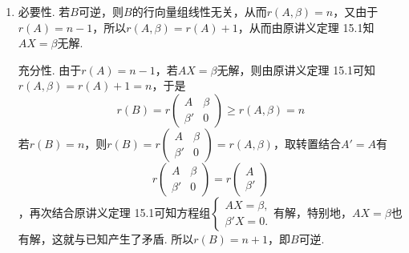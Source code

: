 \documentclass[12pt,fontset=fandol]{ctexart}
\begin{document}
\begin{solve}
\begin{enumerate}
                \item 必要性. 若$B$可逆，则$B$的行向量组线性无关，从而$r(A,\beta)=n$，又由于$r(A)=n-1$，所以$r(A,\beta)=r(A)+1$，从而由原讲义定理 15.1知$AX=\beta$无解.

                      充分性. 由于$r(A)=n-1$，若$AX=\beta$无解，则由原讲义定理 15.1可知$r(A,\beta)=r(A)+1=n$，于是
                      \[ r(B)=r\begin{pmatrix}
                              A      & \beta \\
                              \beta' & 0
                          \end{pmatrix}\geqslant r(A,\beta)=n \]
                      若$r(B)=n$，则$r(B)=r\begin{pmatrix}
                              A      & \beta \\
                              \beta' & 0
                          \end{pmatrix}=r(A,\beta)$，取转置结合$A'=A$有
\[r\begin{pmatrix}
                              A      & \beta \\
                              \beta' & 0
                          \end{pmatrix}=r\begin{pmatrix}
                              A \\
                              \beta'
                          \end{pmatrix}\]
，再次结合原讲义定理 15.1可知方程组$\begin{cases}
                              AX=\beta, \\
                              \beta' X=0.
                          \end{cases}$有解，特别地，$AX=\beta$也有解，这就与已知产生了矛盾. 所以$r(B)=n+1$，即$B$可逆.
            \end{enumerate}
\end{solve}
\end{document}

